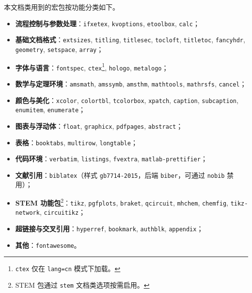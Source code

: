 本文档类用到的宏包按功能分类如下。

\begin{itemize}[noitemsep]
  \item \textbf{流程控制与参数处理}：\texttt{ifxetex}, \texttt{kvoptions}, \texttt{etoolbox}, \texttt{calc}；
  \item \textbf{基础文档格式}：\texttt{extsizes}, \texttt{titling}, \texttt{titlesec}, \texttt{tocloft}, \texttt{titletoc}, \texttt{fancyhdr}, \texttt{geometry}, \texttt{setspace}, \texttt{array}；
  \item \textbf{字体与语言}：\texttt{fontspec}, \texttt{ctex}\footnote{\texttt{ctex} 仅在 \texttt{lang=cn} 模式下加载。}, \texttt{hologo}, \texttt{metalogo}；
  \item \textbf{数学与定理环境}：\texttt{amsmath}, \texttt{amssymb}, \texttt{amsthm}, \texttt{mathtools}, \texttt{mathrsfs}, \texttt{cancel}；
  \item \textbf{颜色与美化}：\texttt{xcolor}, \texttt{colortbl}, \texttt{tcolorbox}, \texttt{xpatch}, \texttt{caption}, \texttt{subcaption}, \texttt{enumitem}, \texttt{enumerate}；
  \item \textbf{图表与浮动体}：\texttt{float}, \texttt{graphicx}, \texttt{pdfpages}, \texttt{abstract}；
  \item \textbf{表格}：\texttt{booktabs}, \texttt{multirow}, \texttt{longtable}；
  \item \textbf{代码环境}：\texttt{verbatim}, \texttt{listings}, \texttt{fvextra}, \texttt{matlab-prettifier}；
  \item \textbf{文献引用}：\texttt{biblatex}（样式 \texttt{gb7714-2015}，后端 \texttt{biber}，可通过 \texttt{nobib} 禁用）；
  \item \textbf{STEM 功能包}\footnote{STEM 包通过 \texttt{stem} 文档类选项按需启用。}：\texttt{tikz}, \texttt{pgfplots}, \texttt{braket}, \texttt{qcircuit}, \texttt{mhchem}, \texttt{chemfig}, \texttt{tikz-network}, \texttt{circuitikz}；
  \item \textbf{超链接与交叉引用}：\texttt{hyperref}, \texttt{bookmark}, \texttt{authblk}, \texttt{appendix}；
  \item \textbf{其他}：\texttt{fontawesome}。
\end{itemize}